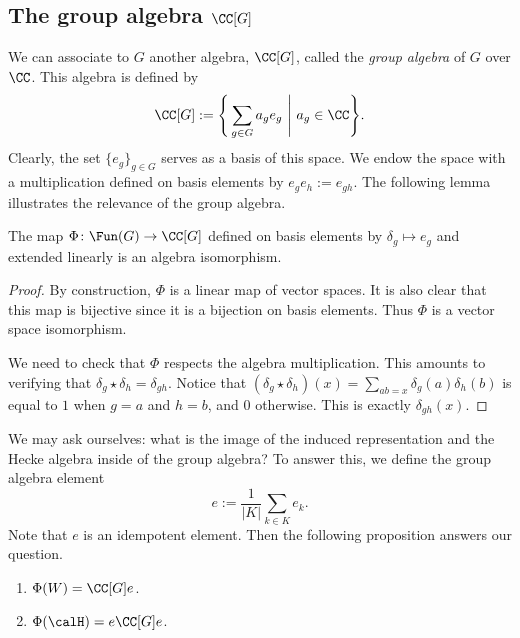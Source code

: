 \subsection{The group algebra $\CC[G]$}\label{Section1.4}
We can associate to $G$ another algebra, $\CC[G]$, called the \emph{group algebra} of $G$ over $\CC$.
This algebra is defined by
\[
	\CC[G] := \Bigg\{ \sum_{g\in G} a_g e_g\ \Bigg|\ a_g\in \CC \Bigg\}.
\]
Clearly, the set $\{e_g\}_{g\in G}$ serves as a basis of this space.
We endow the space with a multiplication defined on basis elements by $e_ge_h := e_{gh}$.
The following lemma illustrates the relevance of the group algebra.
\begin{lem}
	The map $\Phi\colon \Fun(G)\to\CC[G]$ defined on basis elements by $\delta_g\mapsto e_g$ and extended linearly is an algebra isomorphism.
\end{lem}
\begin{proof}
	By construction, $\Phi$ is a linear map of vector spaces.
	It is also clear that this map is bijective since it is a bijection on basis elements.
	Thus $\Phi$ is a vector space isomorphism.

	We need to check that $\Phi$ respects the algebra multiplication.
	This amounts to verifying that $\delta_g \star \delta_h = \delta_{gh}$.
	Notice that $(\delta_g\star\delta_h)(x) = \sum_{ab=x} \delta_g(a)\delta_h(b)$ is equal to $1$ when $g=a$ and $h=b$, and $0$ otherwise.
	This is exactly $\delta_{gh}(x)$.
\end{proof}
We may ask ourselves: what is the image of the induced representation and the Hecke algebra inside of the group algebra? To answer this, we define the group algebra element
\[
	e := \frac{1}{|K|} \sum_{k\in K} e_k.
\]
Note that $e$ is an idempotent element.
Then the following proposition answers our question.
\begin{prop}
	\begin{enumerate}[\itshape(i)]
		\item $\Phi(W) = \CC[G]e$.
		\item $\Phi(\calH) = e \CC[G] e$.
	\end{enumerate}
\end{prop}
